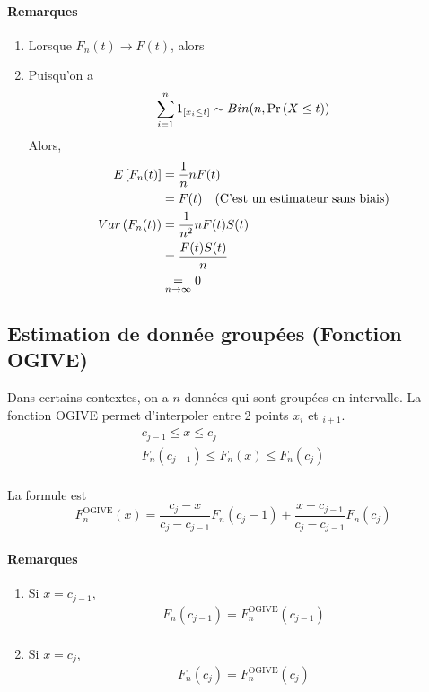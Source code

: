 \documentclass[12pt, french]{report}
\begin{document}
\paragraph{Remarques}
\begin{enumerate}[label=(\arabic*)]
\item Lorsque $F_n(t) \to F(t)$, alors

\item Puisqu'on a
\begin{align*}
\sum_{i=1}^{n} 1_{[x_i \leq t]} \sim Bin(n,\Pr \left( X \leq t \right))
\end{align*}
Alors,
\begin{align*}
E \left[ F_n(t) \right]		& = \frac{1}{n} n F(t) \\
	& = F(t) \quad \text{(C'est un estimateur sans biais)} \\
Var \left( F_n(t) \right) & = \frac{1}{n^2}  n F(t) S(t) \\
	& = \frac{F(t) S(t)}{n}	\\
	& \underset{n \to \infty}{=} 0 \\
\end{align*}
\end{enumerate}

\subsection{Estimation de donnée groupées (Fonction OGIVE)}


Dans certains contextes, on a $n$ données qui sont groupées en intervalle. La fonction OGIVE permet d'interpoler entre 2 points $x_i$ et $_{i+1}$.
\begin{align*}
c_{j-1} 	 \leq x  \leq c_j \\
F_n(c_{j-1})	 \leq F_n(x)	 \leq F_n(c_j) \\
\end{align*}


La formule est
\begin{equation}
\label{eq:repart-OGIVE}
F_n^{\text{OGIVE}}(x) = \frac{c_j - x}{c_j - c_{j-1}} F_n(c_j -1) + \frac{x - c_{j-1}}{c_j - c_{j-1}} F_n(c_j)
\end{equation}
\paragraph{Remarques}
\begin{enumerate}[label=(\arabic*)]
\item Si $x = c_{j-1}$,
\begin{align*}
F_n(c_{j-1}) = F_n^{\text{OGIVE}}(c_{j-1}) \\
\end{align*}
\item Si $x = c_j$,
\begin{align*}
F_n(c_j) = F_n^{\text{OGIVE}}(c_j)
\end{align*}
\end{enumerate}
\end{document}
